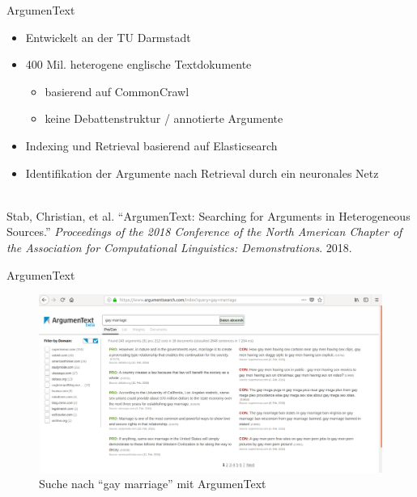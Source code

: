 \documentclass{beamer}
\begin{document}
	\begin{frame}{ArgumenText}
		\begin{itemize}
			\item Entwickelt an der TU Darmstadt
			\item 400 Mil. heterogene englische Textdokumente
			\begin{itemize}
				\item basierend auf CommonCrawl
				\item keine Debattenstruktur / annotierte Argumente
			\end{itemize}
			\item Indexing und Retrieval basierend auf Elasticsearch
			\item Identifikation der Argumente nach Retrieval durch ein neuronales Netz
		\end{itemize}
		~\\
		\tiny Stab, Christian, et al. ``ArgumenText: Searching for Arguments in Heterogeneous Sources.''
		\textit{Proceedings of the 2018 Conference of the North American Chapter of the Association for
		Computational Linguistics: Demonstrations}. 2018.
	\end{frame}
	\begin{frame}{ArgumenText}
		\begin{figure}
			\includegraphics[width=\textwidth]{img/argumentext-screenshot-gay-marriage}
			\caption{Suche nach ``gay marriage'' mit ArgumenText}
		\end{figure}
	\end{frame}
\end{document}
